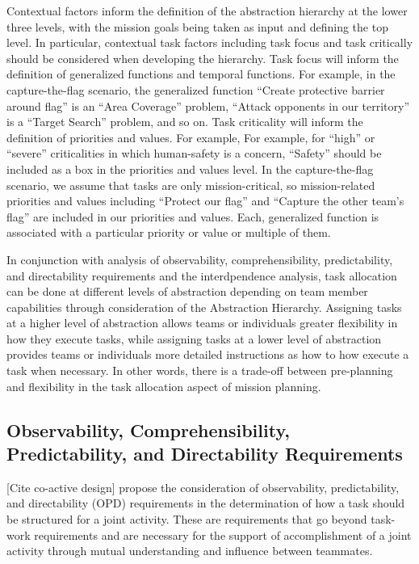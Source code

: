 \documentclass[letterpaper, 10 pt, conference]{ieeeconf}  %
\theoremstyle{definition}
\begin{document}
Contextual factors inform the definition of the abstraction hierarchy at the lower three levels, with the mission goals being taken as input and defining the top level. In particular, contextual task factors including task focus and task critically should be considered when developing the hierarchy. Task focus will inform the definition of generalized functions and temporal functions. For example, in the capture-the-flag scenario, the generalized function ``Create protective barrier around flag'' is an ``Area Coverage'' problem, ``Attack opponents in our territory'' is a ``Target Search'' problem, and so on. Task criticality will inform the definition of priorities and values. For example, For example, for ``high'' or ``severe'' criticalities in which human-safety is a concern, ``Safety'' should be included as a box in the priorities and values level. In the capture-the-flag scenario, we assume that tasks are only mission-critical, so mission-related priorities and values including ``Protect our flag'' and ``Capture the other team's flag'' are included in our priorities and values. Each, generalized function is associated with a particular priority or value or multiple of them.




In conjunction with analysis of observability, comprehensibility, predictability, and directability requirements and the interdpendence analysis, task allocation can be done at different levels of abstraction depending on team member capabilities through consideration of the Abstraction Hierarchy. Assigning tasks at a higher level of abstraction allows teams or individuals greater flexibility in how they execute tasks, while assigning tasks at a lower level of abstraction provides teams or individuals more detailed instructions as how to how execute a task when necessary. In other words, there is a trade-off between pre-planning and flexibility in the task allocation aspect of mission planning.

\subsection{Observability, Comprehensibility, Predictability, and Directability Requirements}
\label{sec:OCPD}
[Cite co-active design] propose the consideration of observability, predictability, and directability (OPD) requirements in the determination of how a task should be structured for a joint activity. These are requirements that go beyond task-work requirements and are necessary for the support of accomplishment of a joint activity through mutual understanding and influence between teammates. 
\end{document}
